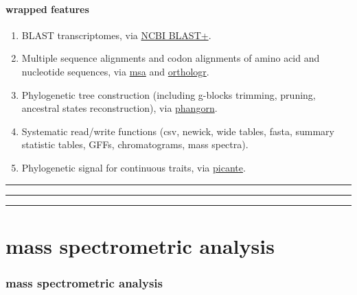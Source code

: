 \documentclass[
]{krantz}
\providecommand{\tightlist}{%
  \setlength{\itemsep}{0pt}\setlength{\parskip}{0pt}}
\begin{document}
\hypertarget{wrapped-features}{%
\subsection{wrapped features}\label{wrapped-features}}

\begin{enumerate}
\def\labelenumi{\arabic{enumi}.}
\tightlist
\item
  BLAST transcriptomes, via \href{https://blast.ncbi.nlm.nih.gov/Blast.cgi?PAGE_TYPE=BlastDocs\&DOC_TYPE=Download}{NCBI BLAST+}.
\item
  Multiple sequence alignments and codon alignments of amino acid and nucleotide sequences, via \href{https://bioconductor.org/packages/release/bioc/html/msa.html}{msa} and \href{https://github.com/HajkD/orthologr}{orthologr}.
\item
  Phylogenetic tree construction (including g-blocks trimming, pruning, ancestral states reconstruction), via \href{https://cran.r-project.org/web/packages/phangorn/index.html}{phangorn}.
\item
  Systematic read/write functions (csv, newick, wide tables, fasta, summary statistic tables, GFFs, chromatograms, mass spectra).
\item
  Phylogenetic signal for continuous traits, via \href{https://cran.r-project.org/web/packages/picante/index.html}{picante}.
\end{enumerate}

\begin{center}\rule{0.5\linewidth}{0.5pt}\end{center}

\begin{center}\rule{0.5\linewidth}{0.5pt}\end{center}

\begin{center}\rule{0.5\linewidth}{0.5pt}\end{center}

\hypertarget{part-mass-spectrometric-analysis}{%
\part{mass spectrometric analysis}\label{part-mass-spectrometric-analysis}}

\hypertarget{mass-spectrometric-analysis}{%
\section{mass spectrometric analysis}\label{mass-spectrometric-analysis}}
\end{document}
